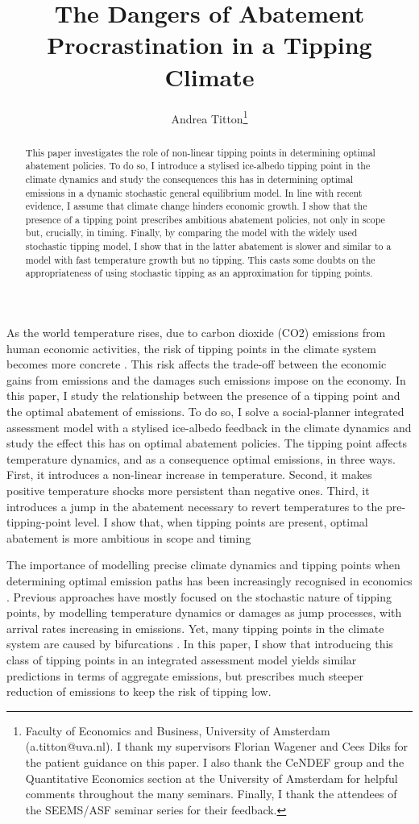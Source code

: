 \documentclass[11pt]{article}
\author{Andrea Titton\thanks{
      Faculty of Economics and Business, University of Amsterdam (a.titton@uva.nl). I thank my supervisors Florian Wagener and Cees Diks for the patient guidance on this paper. I also thank the CeNDEF group and the Quantitative Economics section at the University of Amsterdam for helpful comments throughout the many seminars. Finally, I thank the attendees of the SEEMS/ASF seminar series for their feedback.
    }}
\title{The Dangers of Abatement Procrastination in a Tipping Climate}
\begin{document}
\maketitle

\begin{abstract}
  This paper investigates the role of non-linear tipping points in determining optimal abatement policies. To do so, I introduce a stylised ice-albedo tipping point in the climate dynamics and study the consequences this has in determining optimal emissions in a dynamic stochastic general equilibrium model. In line with recent evidence, I assume that climate change hinders economic growth. I show that the presence of a tipping point prescribes ambitious abatement policies, not only in scope but, crucially, in timing. 
  Finally, by comparing the model with the widely used stochastic tipping model, I show that in the latter abatement is slower and similar to a model with fast temperature growth but no tipping. This casts some doubts on the appropriateness of using stochastic tipping as an approximation for tipping points.
\end{abstract}

\newpage
As the world temperature rises, due to carbon dioxide (CO2) emissions from human economic activities, the risk of tipping points in the climate system becomes more concrete \citep{ashwin_extreme_2020,sledd_cloudier_2021}. This risk affects the trade-off between the economic gains from emissions and the damages such emissions impose on the economy. In this paper, I study the relationship between the presence of a tipping point and the optimal abatement of emissions. To do so, I solve a social-planner integrated assessment model with a stylised ice-albedo feedback in the climate dynamics \citep{hogg_glacial_2008,ashwin_tipping_2012} and study the effect this has on optimal abatement policies. The tipping point affects temperature dynamics, and as a consequence optimal emissions, in three ways. First, it introduces a non-linear increase in temperature. Second, it makes positive temperature shocks more persistent than negative ones. Third, it introduces a jump in the abatement necessary to revert temperatures to the pre-tipping-point level. I show that, when tipping points are present, optimal abatement is more ambitious in scope and timing

The importance of modelling precise climate dynamics and tipping points when determining optimal emission paths has been increasingly recognised in economics \citep{van_den_bremer_risk-adjusted_2021,dietz_economic_2021,dietz_are_2020,taconet_social_2021,lontzek_stochastic_2015}. Previous approaches have mostly focused on the stochastic nature of tipping points, by modelling temperature dynamics \citep{dietz_economic_2021} or damages \citep{lontzek_stochastic_2015} as jump processes, with arrival rates increasing in emissions. Yet, many tipping points in the climate system are caused by bifurcations \citep{ashwin_extreme_2020,ashwin_tipping_2012}. In this paper, I show that introducing this class of tipping points in an integrated assessment model yields similar predictions in terms of aggregate emissions, but prescribes much steeper reduction of emissions to keep the risk of tipping low.
\end{document}
